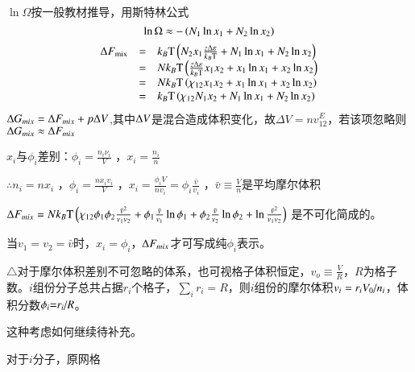 \documentclass{article} %
\begin{document}
\noindent $\ln \Omega $按一般教材推导，用斯特林公式
\[\ln {\rm \Omega }\approx -\left(N_{1} \ln x_{1} +N_{2} \ln x_{2} \right)\] 
\[\begin{array}{rcl} {{\rm \Delta }F_{\mathrm{mix}} } & {=} & {k_{B} {\rm T} \left(N_{2} x_{1} \frac{z{\rm \Delta }\varepsilon }{k_{B} {\rm T} } +N_{1} \ln x_{1} +N_{2} \ln x_{2} \right)} \\ {} & {=} & {Nk_{B} {\rm T} \left(\frac{z{\rm \Delta }\varepsilon }{k_{B} {\rm T} } x_{1} x_{2} +x_{1} \ln x_{1} +x_{2} \ln x_{2} \right)} \\ {} & {=} & {Nk_{B} {\rm T} \left(\chi _{12} x_{1} x_{2} +x_{1} \ln x_{1} +x_{2} \ln x_{2} \right)} \\ {} & {=} & {k_{B} {\rm T} \left(\chi _{12} N_{1} x_{2} +N_{1} \ln x_{1} +N_{2} \ln x_{2} \right)} \end{array}\] 
${\rm \Delta }G_{mix} ={\rm \Delta }F_{mix} +p{\rm \Delta }V$,其中${\rm \Delta }V$是混合造成体积变化，故$\Delta V=nv_{12}^{E} $，若该项忽略则${\rm \Delta }G_{mix} \approx {\rm \Delta }F_{mix} $

 $x_{i} $与$\phi _{i} $差别：$\phi _{i} =\frac{n_{i} \nu _{i} }{V} $ ，$x_{i} =\frac{n_{i} }{n} $ 

 $\therefore n_{i} =nx_{i} $ ，$\phi _{i} =\frac{nx_{i} v_{i} }{V} $ ，$x_{i} =\frac{\phi _{i} V}{nv_{i} } =\phi _{i} \frac{\bar{v}}{v_{i} } $ ，$\bar{v}\equiv \frac{V}{n} $是平均摩尔体积

 ${\rm \Delta }F_{mix} =Nk_{B} {\rm T} \left(\chi _{12} \phi _{1} \phi _{2} \frac{\bar{v}^{2} }{v_{1} v_{2} } +\phi _{1} \frac{\bar{v}}{v_{1} } \ln \phi _{1} +\phi _{2} \frac{\bar{v}}{v_{2} } \ln \phi _{2} +\ln \frac{\bar{v}^{2} }{v_{1} v_{2} } \right)$ 是不可化简成的。

\noindent 当$v_{1} =v_{2} =\bar{v}$时，$x_{i} =\phi _{i} $，${\rm \Delta }F_{mix} $才可写成纯$\phi _{i} $表示。 

\noindent $\mathrm{\triangle}$对于摩尔体积差别不可忽略的体系，也可视格子体积恒定，$v_{o} \equiv \frac{V}{R} $，$R$为格子数。$i$组份分子总共占据$r_{i} $个格子，$\sum _{i}r_{i}  =R$，则$i$组份的摩尔体积$v_{i} ={r_{i} V_{0} \mathord{\left/ {\vphantom {r_{i} V_{0}  n_{i} }} \right. \kern-\nulldelimiterspace} n_{i} } $，体积分数$\phi _{i} {\rm =}{r_{i} \mathord{\left/ {\vphantom {r_{i}  R}} \right. \kern-\nulldelimiterspace} R} $。

\noindent 这种考虑如何继续待补充。

\noindent 对于$i$分子，原网格

\noindent \eject 
\end{document}
